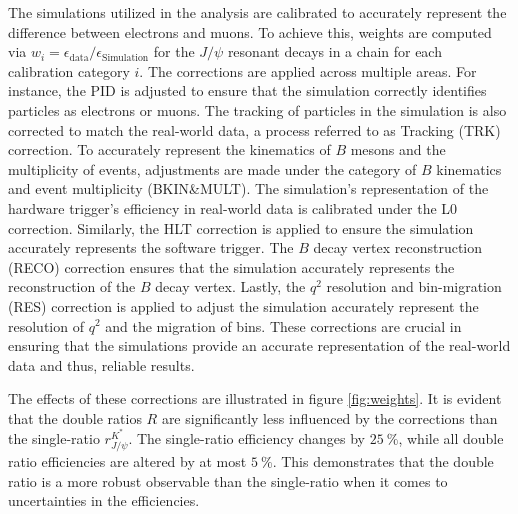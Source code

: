 The simulations utilized in the analysis are calibrated to accurately represent the difference 
between electrons and muons. To achieve this, weights are computed via 
$w_i=\epsilon_\text{data}/\epsilon_\text{Simulation}$ for the $J\!/\!\psi$ resonant decays in a chain 
for each calibration category $i$. 
The corrections are applied across multiple areas. For instance, the PID is adjusted to ensure 
that the simulation correctly identifies particles as electrons or muons. The tracking of 
particles in the simulation is also corrected to match the real-world data, a process referred 
to as Tracking (TRK) correction.
To accurately represent the kinematics of $B$ mesons and the multiplicity of events, adjustments 
are made under the category of $B$ kinematics and event multiplicity (BKIN\&MULT). The simulation's
representation of the hardware trigger's efficiency in real-world data is calibrated under the 
L0 correction.
Similarly, the HLT correction is applied to ensure the simulation accurately represents the software 
trigger. The $B$ decay vertex reconstruction (RECO) correction ensures that the simulation accurately 
represents the reconstruction of the $B$ decay vertex.
Lastly, the $q^2$ resolution and bin-migration (RES) correction is applied to adjust the simulation 
accurately represent the resolution of $q^2$ and the migration of bins. These corrections are crucial 
in ensuring that the simulations provide an accurate representation of the real-world data and thus, 
reliable results.

The effects of these corrections are illustrated in figure \ref{fig:weights}. 
It is evident that the double ratios $R$ are significantly less influenced by the corrections 
than the single-ratio $r^{K^*}_{J\!/\!\psi}$. The single-ratio efficiency changes by $\SI{25}{\%}$, 
while all double ratio efficiencies are altered by at most $\SI{5}{\%}$. This demonstrates that 
the double ratio is a more robust observable than the single-ratio when it comes to uncertainties 
in the efficiencies.


